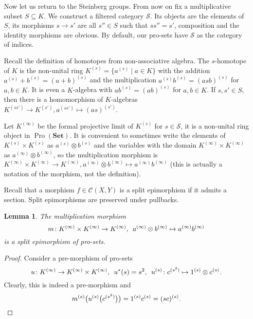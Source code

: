 \documentclass{article}
\newtheorem{lemma}{Lemma}
\newcommand{\rar}{\rightarrow}
\newcommand{\Set}{\mathbf{Set}}
\DeclareMathOperator{\Pro}{Pro}
\begin{document}
Now let us return to the Steinberg groups. From now on fix a multiplicative subset \(S \subseteq K\). We construct a filtered category \(\mathcal S\). Its objects are the elements of \(S\), its morphisms \(s \rar s'\) are all \(s'' \in S\) such that \(ss'' = s'\), composition and the identity morphisms are obvious. By default, our pro-sets have \(\mathcal S\) as the category of indices.

Recall the definition of homotopes from non-associative algebra. The \(s\)-homotope of \(K\) is the non-unital ring \(K^{(s)} = \{a^{(s)} \mid a \in K\}\) with the addition \(a^{(s)} + b^{(s)} = (a + b)^{(s)}\) and the multiplication \(a^{(s)} b^{(s)} = (asb)^{(s)}\) for \(a, b \in K\). It is even a \(K\)-algebra with \(ab^{(s)} = (ab)^{(s)}\) for \(a, b \in K\). If \(s, s' \in S\), then there is a homomorphism of \(K\)-algebras \(K^{(ss')} \rar K^{(s')}, a^{(ss')} \mapsto (as)^{(s')}\).

Let \(K^{(\infty)}\) be the formal projective limit of \(K^{(s)}\) for \(s \in \mathcal S\), it is a non-unital ring object in \(\Pro(\Set)\). It is convenient to sometimes write the elements of \(K^{(s)} \times K^{(s)}\) as \(a^{(s)} \otimes b^{(s)}\) and the variables with the domain \(K^{(\infty)} \times K^{(\infty)}\) as \(a^{(\infty)} \otimes b^{(\infty)}\), so the multiplication morphism is \(K^{(\infty)} \times K^{(\infty)} \rar K^{(\infty)}, a^{(\infty)} \otimes b^{(\infty)} \mapsto a^{(\infty)} b^{(\infty)}\) (this is actually a notation of the morphism, not the definition).

Recall that a morphism \(f \in \mathcal C(X, Y)\) is a split epimorphism if it admits a section. Split epimorphisms are preserved under pullbacks.

\begin{lemma}\label{RingGeneration}
The multiplication morphism
\[m \colon K^{(\infty)} \times K^{(\infty)} \rar K^{(\infty)}, \enskip a^{(\infty)} \otimes b^{(\infty)} \mapsto a^{(\infty)} b^{(\infty)}\]
is a split epimorphism of pro-sets.
\end{lemma}
\begin{proof}
Consider a pre-morphism of pro-sets
\[u \colon K^{(\infty)} \rar K^{(\infty)} \times K^{(\infty)}, \enskip u^*(s) = s^2, \enskip u^{(s)} \colon c^{(s^2)} \mapsto 1^{(s)} \otimes c^{(s)}.\]
Clearly, this is indeed a pre-morphism and
\[
m^{(s)}\bigl(u^{(s)}\bigl(c^{(s^2)}\bigr)\bigr) = 1^{(s)} c^{(s)} = (sc)^{(s)}.\qedhere
\]
\end{proof}
\end{document}
